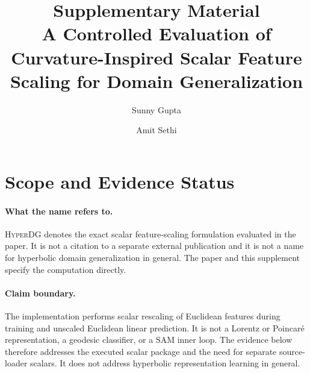 \documentclass[10pt]{article}
\title{Supplementary Material\\
\large A Controlled Evaluation of Curvature-Inspired Scalar Feature Scaling
for Domain Generalization}
\author{Sunny Gupta \and Amit Sethi}
\date{}
\newcommand{\method}{\textsc{HyperDG}}
\begin{document}
\maketitle
\vspace{-1.8em}

\section{Scope and Evidence Status}
\label{sec:scope}

\paragraph{What the name refers to.}
\method{} denotes the exact scalar feature-scaling formulation evaluated in
the paper. It is not a citation to a separate external publication and it is
not a name for hyperbolic domain generalization in general. The paper and this
supplement specify the computation directly.

\paragraph{Claim boundary.}
The implementation performs scalar rescaling of Euclidean features during
training and unscaled Euclidean linear prediction. It is not a Lorentz or
Poincar\'e representation, a geodesic classifier, or a SAM inner loop. The
evidence below therefore addresses the executed scalar package and the need
for separate source-loader scalars. It does not address hyperbolic
representation learning in general.
\end{document}
